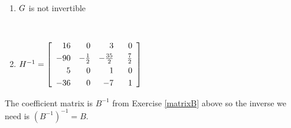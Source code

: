 \documentclass{ximera}
\begin{document}
\begin{multicols}{2} 
\begin{enumerate}
\setcounter{enumi}{\value{HW}}

\item $G \vphantom{\left[ \begin{array}{rrrr} 16 & 0 & 3 & 0 \\[3pt] -90 & -\frac{1}{2} & -\frac{35}{2} & \frac{7}{2} \\[3pt] 5 & 0 & 1 & 0 \\[3pt] -36 & 0 & -7 & \hphantom{-}1 \end{array} \right]}$ is not invertible
\item $H^{-1} = \left[ \begin{array}{rrrr} 16 & 0 & 3 & 0 \\[3pt] -90 & -\frac{1}{2} & -\frac{35}{2} & \frac{7}{2} \\[3pt] 5 & 0 & 1 & 0 \\[3pt] -36 & 0 & -7 & \hphantom{-}1 \end{array} \right]$

\setcounter{HW}{\value{enumi}}
\end{enumerate}
\end{multicols}

The coefficient matrix is $B^{-1}$ from Exercise \ref{matrixB} above so the inverse we need is $(B^{-1})^{-1} = B$. 
\end{document}
